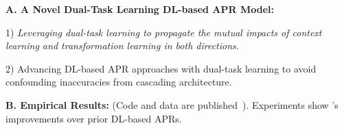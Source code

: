 
{\bf A. A Novel Dual-Task Learning DL-based APR Model:}

1) {\em Leveraging dual-task learning to propagate
  the mutual impacts of context learning and transformation learning
  in both directions}.

2) Advancing DL-based APR approaches with dual-task learning
to avoid confounding inaccuracies from cascading architecture.




{\bf B. Empirical Results:} (Code and data are
published~\cite{CDFix2022}).
Experiments show {\tool}'s improvements over prior
DL-based APRs.




